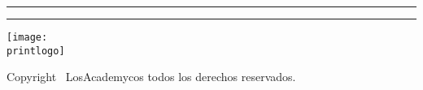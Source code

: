 \newcommand{\CoverName}{Cover}%
\makeatletter  
\makeatother
\begin{titlepage}
	\renewcommand{\thepage}{\CoverName}
	\noindent
\end{titlepage}
\newpage\text{ }\thispagestyle{empty}\newpage 
\begin{coverpage}
		\vspace{2cm}
		\begin{tcolorbox}[transparentbox, width = \textwidth]
			\begin{center}
				\printtitle
			\end{center}
			\printauthor 
			\begin{center}
				{	
					\color{contraportada}\rule{\linewidth}{2pt}
					\hspace{2cm}\rule{\linewidth-2cm}{2pt}
				}
			\end{center}
			
		\end{tcolorbox}
		\begin{tcolorbox}[transparentbox, width = \textwidth]
			\begin{flushright}
				\Large\printedicion
			\end{flushright}
		\end{tcolorbox}
		\vspace{7cm}
		\begin{tcolorbox}
			\begin{center}
				\texttt{[image: \\printlogo]} 
			\end{center}
		\end{tcolorbox}
\end{coverpage}
\begin{copyrightpage}
	\Large Copyright \textcopyright\ LosAcademycos todos los derechos reservados.
\end{copyrightpage}		
\newpage\text{ }\thispagestyle{empty}\newpage 